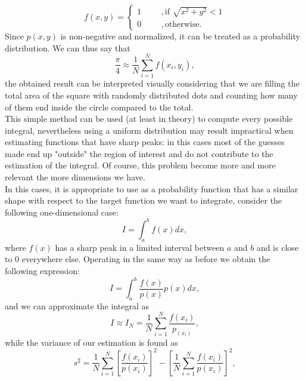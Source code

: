 \begin{equation}
    f(x,y)=
    \begin{cases}
    1\hspace{1cm},\text{if }\sqrt{x^2+y^2}<1\\
    0\hspace{1cm},\text{otherwise}.    
    \end{cases}
\end{equation}
Since $p(x,y)$ is non-negative and normalized, it can be treated as a probability distribution. We can thus say that
\begin{equation}
    \frac{\pi}{4}\approx \frac{1}{N}\sum_{i=1}^N f(x_i,y_i),
\end{equation}
the obtained result can be interpreted visually considering that we are filling the total area of the square with randomly distributed dots 
and counting how many of them end inside the circle compared to the total.\\
This simple method can be used (at least in theory) to compute every possible integral, nevertheless using a uniform distribution may 
result impractical when estimating functions that have sharp peaks: in this cases most of the guesses made end up "outside" the region of interest 
and do not contribute to the estimation of the integral. Of course, this problem become more and more relevant the more dimensions we have.\\
In this cases, it is appropriate to use as a probability function that has a similar shape with respect to the target function we want to 
integrate, consider the following one-dimensional case:
\begin{equation}
    I=\int_{a}^{b}f(x)dx,
\end{equation}
where $f(x)$ has a sharp peak in a limited interval between $a$ and $b$ and is close to 0 everywhere else. Operating in the same 
way as before we obtain the following expression:
\begin{equation}
    I=\int_{a}^{b}\frac{f(x)}{p(x)}p(x)dx,
\end{equation}
and we can approximate the integral as
\begin{equation}
    I\approx I_N=\frac{1}{N}\sum_{i=1}^N\frac{f(x_i)}{p_(x_i)},
\end{equation}
while the variance of our estimation is found as 
\begin{equation}
    s^2=\frac{1}{N}\sum_{i=1}^N\left[\frac{f(x_i)}{p(x_i)}\right]^2-\left[\frac{1}{N}\sum_{i=1}^N\frac{f(x_i)}{p(x_i)}\right]^2,
\end{equation}
